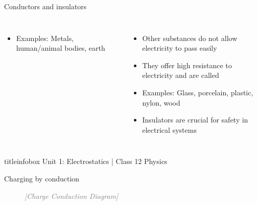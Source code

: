 \begin{frame}
\begin{frame}{Conductors and insulators}
\begin{columns}
\begin{itemize}
            \item Examples: Metals, human/animal bodies, earth
        \end{itemize}
        
        \begin{itemize}
        \item Other substances do not allow electricity to pass easily
            
            \item They offer high resistance to electricity and are called 
            
            \item Examples: Glass, porcelain, plastic, nylon, wood
            
            \item Insulators are crucial for safety in electrical systems
        \end{itemize}
    \end{columns}
    
    \vfill
    
    \begin{beamercolorbox}[wd=\textwidth,ht=0.5cm,dp=0.1cm,center]{titleinfobox}
        \small\color{coolgray} Unit 1: Electrostatics | Class 12 Physics
    \end{beamercolorbox}
\end{frame}


\begin{frame}{Charging by conduction}
    \begin{center}
    \end{center}
    
    \vspace{0.5cm}
    
    \begin{figure}[h]
        \centering
        \textcolor{gray}{\textit{[Charge Conduction Diagram]}}
    \end{figure}
    
    \vfill
    

\end{frame}
\end{frame}
